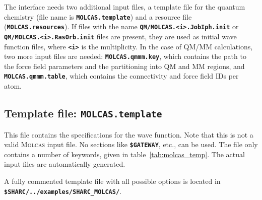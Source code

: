 \documentclass[a4paper,10pt,DIV=15,openany,twoside=false]{scrbook}
\newcommand{\ttt}[1]{\textbf{\texttt{#1}}}
\begin{document}
The interface needs two additional input files, a template file for the quantum chemistry (file name is \ttt{MOLCAS.template}) and a resource file (\ttt{MOLCAS.resources}). If files with the name \ttt{QM/MOLCAS.<i>.JobIph.init} or \ttt{QM/MOLCAS.<i>.RasOrb.init} files are present, they are used as initial wave function files, where \ttt{<i>} is the multiplicity. In the case of QM/MM calculations, two more input files are needed: \ttt{MOLCAS.qmmm.key}, which contains the path to the force field parameters and the partitioning into QM and MM regions, and \ttt{MOLCAS.qmmm.table}, which contains the connectivity and force field IDs per atom.

\subsection{Template file: \ttt{MOLCAS.template}}

This file contains the specifications for the wave function. Note that this is not a valid \textsc{Molcas} input file. No sections like \ttt{\$GATEWAY}, etc., can be used. The file only contains a number of keywords, given in table~\ref{tab:molcas_temp}.
The actual input files are automatically generated.

A fully commented template file with all possible options is located in \ttt{\$SHARC/../examples/SHARC\_MOLCAS/}.
\end{document}
